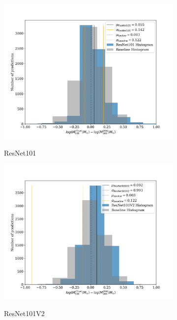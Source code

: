 \begin{figure}[H]
\begin{subfigure}{.325\textwidth}
    \centering
    \includegraphics[width=\linewidth]{images/Chapter4/Results/training_ResNet101_hist.png}
    \label{fig:training_ResNet101_hist}
    \caption{ResNet101}
\end{subfigure}
\begin{subfigure}{.325\textwidth}
    \centering
    \includegraphics[width=\linewidth]{images/Chapter4/Results/training_ResNet101V2_hist.png}
    \label{fig:training_ResNet101V2_hist}
    \caption{ResNet101V2}
\end{subfigure}
\begin{subfigure}{.325\textwidth}
    \centering

\end{subfigure}
\end{figure}
